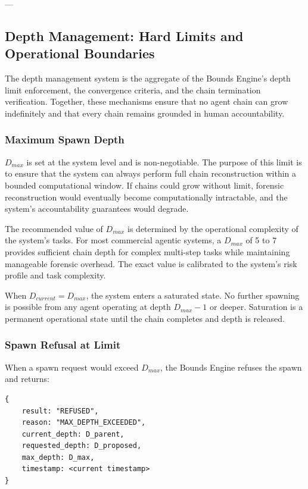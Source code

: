 ---

\subsection{Depth Management: Hard Limits and Operational Boundaries}

The depth management system is the aggregate of the Bounds Engine's depth limit enforcement, the convergence criteria, and the chain termination verification. Together, these mechanisms ensure that no agent chain can grow indefinitely and that every chain remains grounded in human accountability.

\subsubsection{Maximum Spawn Depth}

$D_{max}$ is set at the system level and is non-negotiable. The purpose of this limit is to ensure that the system can always perform full chain reconstruction within a bounded computational window. If chains could grow without limit, forensic reconstruction would eventually become computationally intractable, and the system's accountability guarantees would degrade.

The recommended value of $D_{max}$ is determined by the operational complexity of the system's tasks. For most commercial agentic systems, a $D_{max}$ of 5 to 7 provides sufficient chain depth for complex multi-step tasks while maintaining manageable forensic overhead. The exact value is calibrated to the system's risk profile and task complexity.

When $D_{current} = D_{max}$, the system enters a saturated state. No further spawning is possible from any agent operating at depth $D_{max} - 1$ or deeper. Saturation is a permanent operational state until the chain completes and depth is released.

\subsubsection{Spawn Refusal at Limit}

When a spawn request would exceed $D_{max}$, the Bounds Engine refuses the spawn and returns:

\begin{verbatim}
{
    result: "REFUSED",
    reason: "MAX_DEPTH_EXCEEDED",
    current_depth: D_parent,
    requested_depth: D_proposed,
    max_depth: D_max,
    timestamp: <current timestamp>
}
\end{verbatim}

